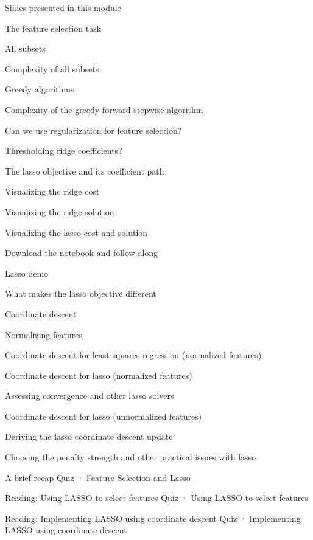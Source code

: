 \item Slides presented in this module
\item The feature selection task
\item All subsets
\item Complexity of all subsets
\item Greedy algorithms
\item Complexity of the greedy forward stepwise algorithm
\item Can we use regularization for feature selection?
\item Thresholding ridge coefficients?
\item The lasso objective and its coefficient path
\item Visualizing the ridge cost
\item Visualizing the ridge solution
\item Visualizing the lasso cost and solution
\item Download the notebook and follow along
\item Lasso demo
\item What makes the lasso objective different
\item Coordinate descent
\item Normalizing features
\item Coordinate descent for least squares regression (normalized features)
\item Coordinate descent for lasso (normalized features)
\item Assessing convergence and other lasso solvers
\item Coordinate descent for lasso (unnormalized features)
\item Deriving the lasso coordinate descent update
\item Choosing the penalty strength and other practical issues with lasso
\item A brief recap
Quiz · Feature Selection and Lasso
\item Reading: Using LASSO to select features
Quiz · Using LASSO to select features
\item Reading: Implementing LASSO using coordinate descent
Quiz · Implementing LASSO using coordinate descent
